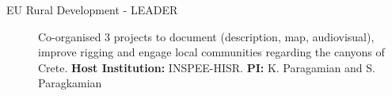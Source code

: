 \begin{description}
    \item[EU Rural Development - LEADER] Co-organised 3 projects
        to document (description, map, audiovisual), improve rigging and engage local communities regarding the canyons of Crete.
        \textbf{Host Institution:} INSPEE-HISR.
        \textbf{PI:} K. Paragamian and S. Paragkamian
\end{description}

